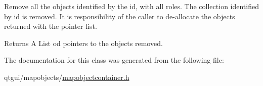 Remove all the objects identified by the id, with all roles. The collection identified by id is removed. It is responsibility of the caller to de-\/allocate the objects returned with the pointer list. 

\begin{DoxyReturn}{Returns}
A List od pointers to the objects removed. 
\end{DoxyReturn}


The documentation for this class was generated from the following file\+:\begin{DoxyCompactItemize}
\item 
qtgui/mapobjects/\mbox{\hyperlink{mapobjectcontainer_8h}{mapobjectcontainer.\+h}}\end{DoxyCompactItemize}
